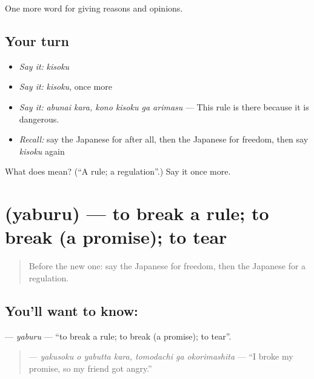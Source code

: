 \begin{grammarlens}[title={What you've built}]
One more word for giving reasons and opinions.
\end{grammarlens}

\subsection*{Your turn}
\begin{itemize}
\raggedright
  \item \emph{Say it:} \emph{kisoku}
  \item \emph{Say it:} \emph{kisoku}, once more
  \item \emph{Say it:} \emph{abunai kara, kono kisoku ga arimasu} — This rule is there because it is dangerous.
  \item \emph{Recall:} say the Japanese for after all, then the Japanese for freedom, then say \emph{kisoku} again
\end{itemize}

\begin{tcolorbox}[breakable,colback=teal!4,colframe=teal!35!black,title={Before you move on}]
What does  mean? (\textquotedblleft{}A rule; a regulation\textquotedblright{}.) Say it once more.
\end{tcolorbox}
\section[\texorpdfstring{\ja{やぶる} (yaburu)}{やぶる (yaburu)}]{ (yaburu) — to break a rule; to break (a promise); to tear}

\label{lesson:JA-C326-yaburu}



\begin{quote}
Before the new one: say the Japanese for freedom, then the Japanese for a regulation.
\end{quote}

\subsection*{You'll want to know: }
\textbf{} — \emph{yaburu} — \textquotedblleft{}to break a rule; to break (a promise); to tear\textquotedblright{}.

\begin{quote}
\textbf{  } — \emph{yakusoku o yabutta kara, tomodachi ga okorimashita} — \textquotedblleft{}I broke my promise, so my friend got angry.\textquotedblright{}
\end{quote}

